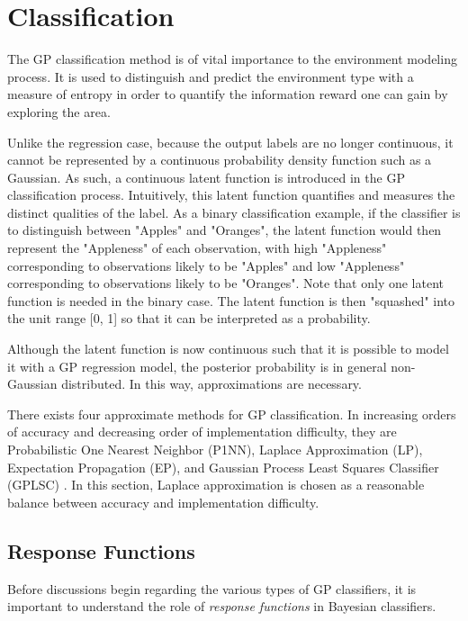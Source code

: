 	\section{Classification}
	\label{Background:GaussianProcesses:Classification}
	
		The GP classification method is of vital importance to the environment modeling process. It is used to distinguish and predict the environment type with a measure of entropy in order to quantify the information reward one can gain by exploring the area.
		
		Unlike the regression case, because the output labels are no longer continuous, it cannot be represented by a continuous probability density function such as a Gaussian. As such, a continuous latent function is introduced in the GP classification process. Intuitively, this latent function quantifies and measures the distinct qualities of the label. As a binary classification example, if the classifier is to distinguish between "Apples" and "Oranges", the latent function would then represent the "Appleness" of each observation, with high "Appleness" corresponding to observations likely to be "Apples" and low "Appleness" corresponding to observations likely to be "Oranges". Note that only one latent function is needed in the binary case. The latent function is then "squashed" into the unit range [0, 1] so that it can be interpreted as a probability.
		
		Although the latent function is now continuous such that it is possible to model it with a GP regression model, the posterior probability is in general non-Gaussian distributed. In this way, approximations are necessary.
		
		There exists four approximate methods for GP classification. In increasing orders of accuracy and decreasing order of implementation difficulty, they are Probabilistic One Nearest Neighbor (P1NN), Laplace Approximation (LP), Expectation Propagation (EP), and Gaussian Process Least Squares Classifier (GPLSC) \cite{GaussianProcessForMachineLearning}. In this section, Laplace approximation is chosen as a reasonable balance between accuracy and implementation difficulty.
		
		\subsection{Response Functions}
		
			Before discussions begin regarding the various types of GP classifiers, it is important to understand the role of \textit{response functions} in Bayesian classifiers.
			
